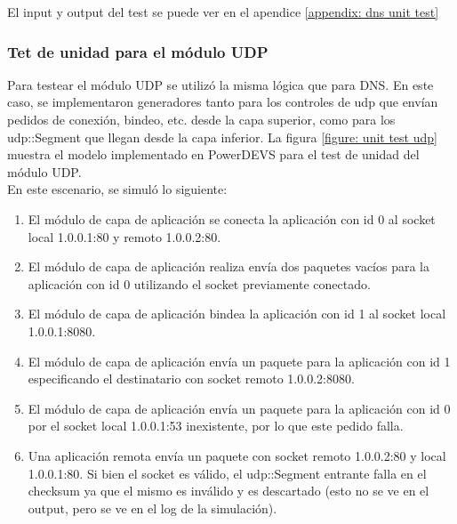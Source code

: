 \documentclass[10pt,a4paper]{article}
\begin{document}
El input y output del test se puede ver en el apendice \ref{appendix: dns unit test}

\newpage

\subsubsection{Tet de unidad para el módulo UDP}

Para testear el módulo UDP se utilizó la misma lógica que para DNS. En este caso, se implementaron generadores tanto para los controles de udp que envían pedidos de conexión, bindeo, etc. desde la capa superior, como para los udp::Segment que llegan desde la capa inferior. La figura \ref{figure: unit test udp} muestra el modelo implementado en PowerDEVS para el test de unidad del módulo UDP. \\

En este escenario, se simuló lo siguiente:
\begin{enumerate}
\item El módulo de capa de aplicación se conecta la aplicación con id 0 al socket local 1.0.0.1:80 y remoto 1.0.0.2:80.
\item El módulo de capa de aplicación realiza envía dos paquetes vacíos para la aplicación con id 0 utilizando el socket previamente conectado.
\item El módulo de capa de aplicación bindea la aplicación con id 1 al socket local 1.0.0.1:8080.
\item El módulo de capa de aplicación envía un paquete para la aplicación con id 1 especificando el destinatario con socket remoto 1.0.0.2:8080.
\item El módulo de capa de aplicación envía un paquete para la aplicación con id 0 por el socket local 1.0.0.1:53 inexistente, por lo que este pedido falla.
\item Una aplicación remota envía un paquete con socket remoto 1.0.0.2:80 y local 1.0.0.1:80. Si bien el socket es válido, el udp::Segment entrante falla en el checksum ya que el mismo es inválido y es descartado (esto no se ve en el output, pero se ve en el log de la simulación).
\end{enumerate}
\end{document}
